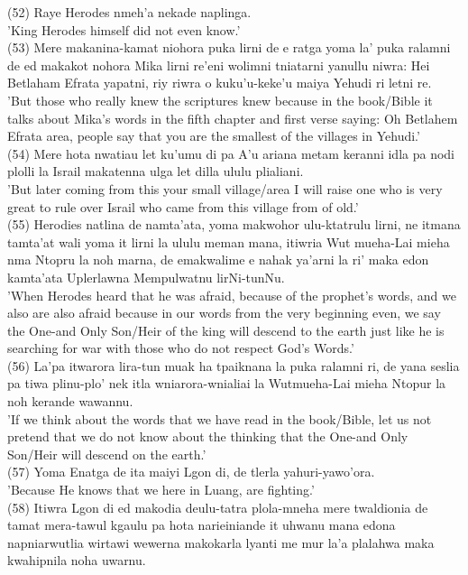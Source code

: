 \documentclass[10pt]{article}
\begin{document}
(52) Raye Herodes nmeh'a nekade naplinga.\\
'King Herodes himself did not even know.'\\
(53) Mere makanina-kamat niohora puka lirni de e ratga yoma la' puka ralamni de ed makakot nohora Mika lirni re'eni wolimni tniatarni yanullu niwra: Hei Betlaham Efrata yapatni, riy riwra o kuku'u-keke'u maiya Yehudi ri letni re.\\
'But those who really knew the scriptures knew because in the book/Bible it talks about Mika's words in the fifth chapter and first verse saying: Oh Betlahem Efrata area, people say that you are the smallest of the villages in Yehudi.'\\
(54) Mere hota nwatiau let ku'umu di pa A'u ariana metam keranni idla pa nodi plolli la Israil makatenna ulga let dilla ululu plialiani.\\
'But later coming from this your small village/area I will raise one who is very great to rule over Israil who came from this village from of old.'\\
(55) Herodies natlina de namta'ata, yoma makwohor ulu-ktatrulu lirni, ne itmana tamta'at wali yoma it lirni la ululu meman mana, itiwria Wut mueha-Lai mieha nma Ntopru la noh marna, de emakwalime e nahak ya'arni la ri' maka edon kamta'ata Uplerlawna Mempulwatnu lirNi-tunNu.\\
'When Herodes heard that he was afraid, because of the prophet's words, and we also are also afraid because in our words from the very beginning even, we say the One-and Only Son/Heir of the king will descend to the earth just like he is searching for war with those who do not respect God's Words.'\\
(56) La'pa itwarora lira-tun muak ha tpaiknana la puka ralamni ri, de yana seslia pa tiwa plinu-plo' nek itla wniarora-wnialiai la Wutmueha-Lai mieha Ntopur la noh kerande wawannu.\\
'If we think about the words that we have read in the book/Bible, let us not pretend that we do not know about the thinking that the One-and Only Son/Heir will descend on the earth.'\\
(57) Yoma Enatga de ita maiyi Lgon di, de tlerla yahuri-yawo'ora.\\
'Because He knows that we here in Luang, are fighting.'\\
(58) Itiwra Lgon di ed makodia deulu-tatra plola-mneha mere twaldionia de tamat mera-tawul kgaulu pa hota narieiniande it uhwanu mana edona napniarwutlia wirtawi wewerna makokarla lyanti me mur la'a plalahwa maka kwahipnila noha uwarnu.\\
\end{document}
